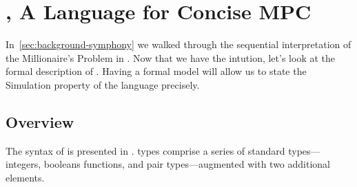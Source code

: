 \chapter{\mpc, A Language for Concise MPC}
\label{ch:lam-mpc}

In~\cref{sec:background-symphony} we walked through the sequential interpretation of the Millionaire's Problem in \mpc. Now that we have
the intution, let's look at the formal description of \mpc. Having a formal model will allow us to state the Simulation property of the
language precisely.


\section{Overview}
\label{sec:lam-mpc-overview}

The syntax of \mpc is presented in . \mpc types comprise a
series of standard types---integers, booleans functions, and pair types---augmented
with two additional elements.

